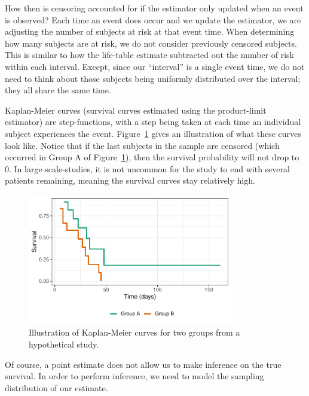 \documentclass[
  letterpaper,
  DIV=11,
  numbers=noendperiod]{scrreprt}
\theoremstyle{definition}
\theoremstyle{definition}
\theoremstyle{remark}
\begin{document}
How then is censoring accounted for if the estimator only updated when
an event is observed? Each time an event does occur and we update the
estimator, we are adjusting the number of subjects at risk at that event
time. When determining how many subjects are at risk, we do not consider
previously censored subjects. This is similar to how the life-table
estimate subtracted out the number of risk within each interval. Except,
since our ``interval'' is a single event time, we do not need to think
about those subjects being uniformly distributed over the interval; they
all share the same time.

Kaplan-Meier curves (survival curves estimated using the product-limit
estimator) are step-functions, with a step being taken at each time an
individual subject experiences the event.
Figure~\ref{fig-surv-km-curves} gives an illustration of what these
curves look like. Notice that if the last subjects in the sample are
censored (which occurred in Group A of Figure~\ref{fig-surv-km-curves}),
then the survival probability will not drop to 0. In large
scale-studies, it is not uncommon for the study to end with several
patients remaining, meaning the survival curves stay relatively high.

\begin{figure}

{\centering \includegraphics[width=0.8\textwidth,height=\textheight]{./images/fig-surv-km-curves-1.pdf}

}

\caption{\label{fig-surv-km-curves}Illustration of Kaplan-Meier curves
for two groups from a hypothetical study.}

\end{figure}

Of course, a point estimate does not allow us to make inference on the
true survival. In order to perform inference, we need to model the
sampling distribution of our estimate.
\end{document}
